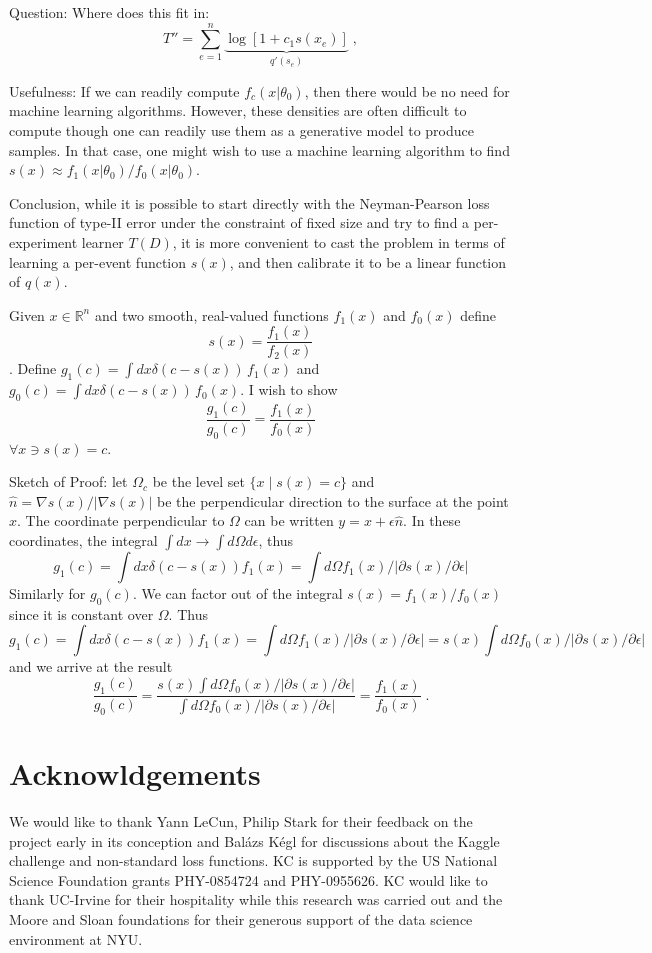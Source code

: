 \documentclass[11pt, oneside]{article}   	%
\begin{document}
Question:
Where does this fit in:
\[
T'' = \sum_{e=1}^n \underbrace{ \log \left[ 1+c_1 s(x_e) \right] }_{q'(s_e)} \;,
\]



Usefulness:
If we can readily compute $f_c(x|\theta_0)$, then there would be no need for machine learning algorithms. However,  these densities are often difficult to compute though one can readily use them as a generative model to produce samples. In that case, one might wish to use a machine learning algorithm to find $s(x) \approx f_1(x|\theta_0) / f_0(x|\theta_0)$. 

Conclusion, while it is possible to start directly with the Neyman-Pearson loss function of type-II error under the constraint of fixed size and try to find a per-experiment learner $T(D)$, it is more convenient to cast the problem in terms of learning a per-event function $s(x)$, and then calibrate it to be a linear function of $q(x)$.

\newpage

Given $x\in \mathbb{R}^n$ and two smooth, real-valued functions $f_1(x)$ and $f_0(x)$ define 
\[ 
s(x)=\frac{f_1(x)}{f_2(x)}
\].
Define $g_1(c) = \int dx \delta(c - s(x) ) \, f_1(x)$ and $g_0(c) = \int dx \delta(c - s(x) ) \, f_0(x)$.
I wish to show
\[
\frac{g_1(c)}{g_0(c)} = \frac{f_1(x)}{f_0(x)}
\]
$\forall x \ni s(x)=c$.

Sketch of Proof: 
let $\Omega_{c}$ be the level set $\{x \mid s(x) = c \}$ and $\hat{n}=\nabla s(x) / |\nabla s(x)|$ be the perpendicular direction to the surface at the point $x$. The  coordinate perpendicular to $\Omega$ can be written $y = x+\epsilon \hat{n}$. In these coordinates, the integral $\int dx \to \int d\Omega d\epsilon$, thus
\[
g_1(c) = \int dx \delta(c-s(x)) f_1(x) = \int d\Omega f_1(x) / |\partial s(x)/\partial \epsilon|
\]
Similarly for $g_0(c)$. We can factor out of the integral $s(x)=f_1(x)/f_0(x)$ since it is constant over $\Omega$.
Thus
\[
g_1(c) = \int dx \delta(c-s(x)) f_1(x) = \int d\Omega f_1(x) / |\partial s(x)/\partial \epsilon| = s(x) \int d\Omega f_0(x) / |\partial s(x)/\partial \epsilon|
\]
and we arrive at the result
\[
\frac{g_1(c)}{g_0(c)} = \frac{s(x) \int d\Omega f_0(x) / |\partial s(x)/\partial \epsilon|}{ \int d\Omega f_0(x) / |\partial s(x)/\partial \epsilon|} = \frac{f_1(x)}{f_0(x)} \;.
\]


\newpage

\section*{Acknowldgements}
We would like to thank Yann LeCun, Philip Stark for their feedback on the
project early in its conception and Bal\'azs K\'egl for discussions about the Kaggle challenge and 
non-standard loss functions.
KC is supported by the US National Science Foundation grants PHY-0854724 and PHY-0955626. 
KC would like to thank UC-Irvine for their hospitality while this research was carried out and the 
Moore and Sloan foundations for their generous support of the data science environment at NYU.
\end{document}
